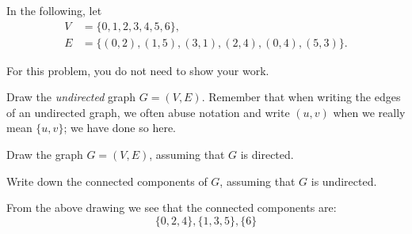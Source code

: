 \begin{prob}
    In the following, let
    \begin{align*}
        V &= \{0,1,2,3,4,5,6\},\\
        E &= \{
        (0,2), 
        (1,5), 
        (3,1), 
        (2,4), 
        (0,4), 
        (5,3) 
    \}.
    \end{align*}

    For this problem, you do not need to show your work.

    \begin{subprobset}
        \begin{subprob}
            Draw the \emph{undirected} graph $G = (V,E)$. Remember that when
            writing the edges of an undirected graph, we often abuse
            notation and write $(u,v)$ when we really mean $\{u,v\}$; we
            have done so here.

            \begin{soln}

                \begin{center}
                \end{center}

            \end{soln}
        \end{subprob}

        \begin{subprob}
            Draw the graph $G = (V,E)$, assuming that $G$ is directed.
        \end{subprob}

        \begin{subprob}
            Write down the connected components of $G$, assuming that $G$ is undirected.

            \begin{soln}
                From the above drawing we see that the connected components
                are:
                \[
                    \{0,2,4\}, \{1,3,5\}, \{6\}
                \]
            \end{soln}
            

\end{subprob}
\end{subprobset}
\end{prob}
